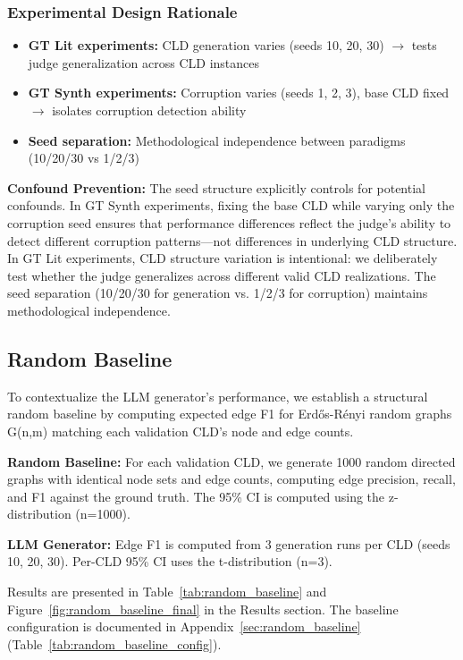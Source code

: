 \subsubsection{Experimental Design Rationale}
\begin{itemize}[noitemsep]
    \item \textbf{GT Lit experiments:} CLD generation varies (seeds 10, 20, 30) $\rightarrow$ tests judge generalization across CLD instances
    \item \textbf{GT Synth experiments:} Corruption varies (seeds 1, 2, 3), base CLD fixed $\rightarrow$ isolates corruption detection ability
    \item \textbf{Seed separation:} Methodological independence between paradigms (10/20/30 vs 1/2/3)
\end{itemize}

\textbf{Confound Prevention:} The seed structure explicitly controls for potential confounds. In GT Synth experiments, fixing the base CLD while varying only the corruption seed ensures that performance differences reflect the judge's ability to detect different corruption patterns---not differences in underlying CLD structure. In GT Lit experiments, CLD structure variation is intentional: we deliberately test whether the judge generalizes across different valid CLD realizations. The seed separation (10/20/30 for generation vs. 1/2/3 for corruption) maintains methodological independence.

\subsection{Random Baseline}

To contextualize the LLM generator's performance, we establish a structural random baseline by computing expected edge F1 for Erd\H{o}s-R\'enyi random graphs G(n,m) matching each validation CLD's node and edge counts.

\textbf{Random Baseline:} For each validation CLD, we generate 1000 random directed graphs with identical node sets and edge counts, computing edge precision, recall, and F1 against the ground truth. The 95\% CI is computed using the z-distribution (n=1000).

\textbf{LLM Generator:} Edge F1 is computed from 3 generation runs per CLD (seeds 10, 20, 30). Per-CLD 95\% CI uses the t-distribution (n=3).

Results are presented in Table~\ref{tab:random_baseline} and Figure~\ref{fig:random_baseline_final} in the Results section.
The baseline configuration is documented in Appendix~\ref{sec:random_baseline} (Table~\ref{tab:random_baseline_config}).

